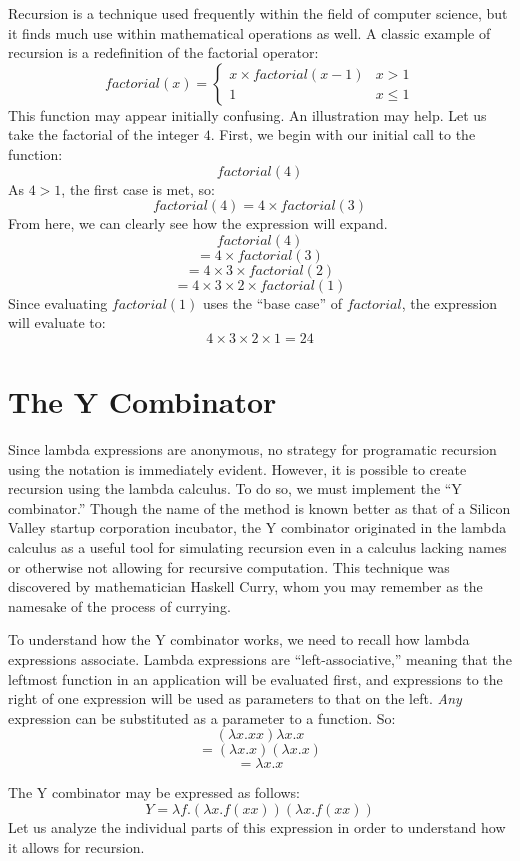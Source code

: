\documentclass[twocolumn,titlepage,12pt]{article}
\begin{document}
Recursion is a technique used frequently within the field of computer science, but it finds much use within mathematical operations as well. A classic example of recursion is a redefinition of the factorial operator:
\[
factorial(x)=
\begin{cases}
    x\times factorial(x-1) & x>1 \\
    1 & x\leq 1
\end{cases}
\]
This function may appear initially confusing. An illustration may help. Let us take the factorial of the integer $4$. First, we begin with our initial call to the function:
$$factorial(4)$$
As $4>1$, the first case is met, so:
$$factorial(4)=4\times factorial(3)$$
From here, we can clearly see how the expression will expand.
$$factorial(4)$$
$$=4\times factorial(3)$$
$$=4\times 3\times factorial(2)$$
$$=4\times 3\times 2\times factorial(1)$$
Since evaluating $factorial(1)$ uses the ``base case'' of $factorial$, the expression will evaluate to:
$$4\times 3\times 2\times 1=24$$

\section{The Y Combinator}
Since lambda expressions are anonymous, no strategy for programatic recursion using the notation is immediately evident. However, it is possible to create recursion using the lambda calculus. To do so, we must implement the ``Y combinator.''\cite{ycombmedium} Though the name of the method is known better as that of a Silicon Valley startup corporation incubator, the Y combinator originated in the lambda calculus as a useful tool for simulating recursion even in a calculus lacking names or otherwise not allowing for recursive computation. This technique was discovered by mathematician Haskell Curry, whom you may remember as the namesake of the process of currying.

To understand how the Y combinator works, we need to recall how lambda expressions associate. Lambda expressions are ``left-associative,'' meaning that the leftmost function in an application will be evaluated first, and expressions to the right of one expression will be used as parameters to that on the left. \textit{Any} expression can be substituted as a parameter to a function. So:
$$(\lambda x.xx)\lambda x.x$$
$$=(\lambda x.x)(\lambda x.x)$$
$$=\lambda x.x$$

The Y combinator may be expressed as follows:
$$Y=\lambda f.(\lambda x.f(x x))(\lambda x.f(x x))$$
Let us analyze the individual parts of this expression in order to understand how it allows for recursion.
\end{document}
